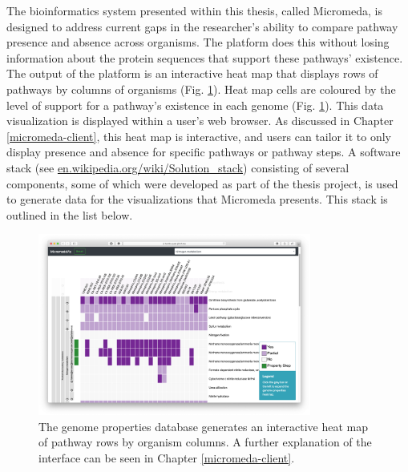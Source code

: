 The bioinformatics system presented within this thesis, called Micromeda, is designed to address current gaps in the researcher's ability to compare pathway presence and absence across organisms. The platform does this without losing information about the protein sequences that support these pathways' existence. The output of the platform is an interactive heat map that displays rows of pathways by columns of organisms (Fig. \ref{fig:basic-heatmap-overview}). Heat map cells are coloured by the level of support for a pathway's existence in each genome (Fig. \ref{fig:basic-heatmap-overview}). This data visualization is displayed within a user's web browser. As discussed in Chapter \ref{micromeda-client}, this heat map is interactive, and users can tailor it to only display presence and absence for specific pathways or pathway steps. A software stack (see \href{en.wikipedia.org/wiki/Solution\_stack}{en.wikipedia.org/wiki/Solution\_stack}) consisting of several components, some of which were developed as part of the thesis project, is used to generate data for the visualizations that Micromeda presents. This stack is outlined in the list below.

\begin{figure}[!ht]
  \centering
	\includegraphics[width=0.8\textwidth]{media/Micromeda-Simple-Overview.png}
	 \caption{The genome properties database generates an interactive heat map of pathway rows by organism columns. A further explanation of the interface can be seen in Chapter \ref{micromeda-client}.}
	 \label{fig:basic-heatmap-overview}
\end{figure}

